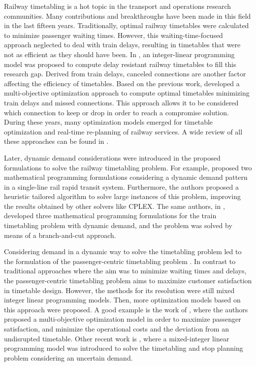 \documentclass[Afour,sagev,times]{sagej}
\begin{document}
Railway timetabling is a hot topic in the transport and operations research communities. Many contributions and breakthroughs have been made in this field in the last fifteen years. Traditionally, optimal railway timetables were calculated to minimize passenger waiting times. However, this waiting-time-focused approach neglected to deal with train delays, resulting in timetables that were not as efficient as they should have been. In \cite{Liebchen2010}, an integer-linear programming model was proposed to compute delay resistant railway timetables to fill this research gap. Derived from train delays, canceled connections are another factor affecting the efficiency of timetables. Based on the previous work, \cite{Corman2012} developed a multi-objective optimization approach to compute optimal timetables minimizing train delays and missed connections. This approach allows it to be considered which connection to keep or drop in order to reach a compromise solution. During these years, many optimization models emerged for timetable optimization and real-time re-planning of railway services. A wide review of all these approaches can be found in \cite{Cacchiani2014}.

Later, dynamic demand considerations were introduced in the proposed formulations to solve the railway timetabling problem. For example, \cite{Barrena2014} proposed two mathematical programming formulations considering a dynamic demand pattern in a single-line rail rapid transit system. Furthermore, the authors proposed a heuristic tailored algorithm to solve large instances of this problem, improving the results obtained by other solvers like CPLEX. The same authors, in \cite{Barrena2014_2}, developed three mathematical programming formulations for the train timetabling problem with dynamic demand, and the problem was solved by means of a branch-and-cut approach.

Considering demand in a dynamic way to solve the timetabling problem led to the formulation of the passenger-centric timetabling problem \cite{Robenek2016}. In contrast to traditional approaches where the aim was to minimize waiting times and delays, the passenger-centric timetabling problem aims to maximize customer satisfaction in timetable design. However, the methods for its resolution were still mixed integer linear programming models. Then, more optimization models based on this approach were proposed. A good example is the work of \cite{Binder2017}, where the authors proposed a multi-objective optimization model in order to maximize passenger satisfaction, and minimize the operational costs and the deviation from an undisrupted timetable. Other recent work is \cite{Cacchiani2020}, where a mixed-integer linear programming model was introduced to solve the timetabling and stop planning problem considering an uncertain demand.
\end{document}
